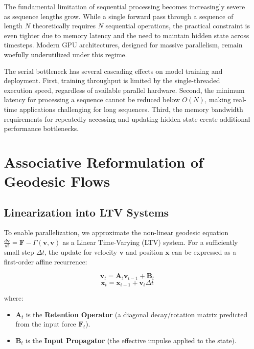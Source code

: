 \documentclass[12pt,a4paper]{article}
\newcommand{\bA}{\mathbf{A}}
\newcommand{\bv}{\mathbf{v}}
\newcommand{\bx}{\mathbf{x}}
\begin{document}
The fundamental limitation of sequential processing becomes increasingly severe as sequence lengths grow. While a single forward pass through a sequence of length $N$ theoretically requires $N$ sequential operations, the practical constraint is even tighter due to memory latency and the need to maintain hidden state across timesteps. Modern GPU architectures, designed for massive parallelism, remain woefully underutilized under this regime.

The serial bottleneck has several cascading effects on model training and deployment. First, training throughput is limited by the single-threaded execution speed, regardless of available parallel hardware. Second, the minimum latency for processing a sequence cannot be reduced below $O(N)$, making real-time applications challenging for long sequences. Third, the memory bandwidth requirements for repeatedly accessing and updating hidden state create additional performance bottlenecks.

\section{Associative Reformulation of Geodesic Flows}

\subsection{Linearization into LTV Systems}

To enable parallelization, we approximate the non-linear geodesic equation $\frac{d\mathbf{v}}{dt} = \mathbf{F} - \Gamma(\mathbf{v}, \mathbf{v})$ as a Linear Time-Varying (LTV) system. For a sufficiently small step $\Delta t$, the update for velocity $\mathbf{v}$ and position $\mathbf{x}$ can be expressed as a first-order affine recurrence:

\begin{equation}
\bv_t = \bA_t \bv_{t-1} + \mathbf{B}_t
\end{equation}
\begin{equation}
\bx_t = \bx_{t-1} + \bv_t \Delta t
\end{equation}

where:
\begin{itemize}[leftmargin=1.5cm]
\item $\bA_t$ is the \textbf{Retention Operator} (a diagonal decay/rotation matrix predicted from the input force $\mathbf{F}_t$).
\item $\mathbf{B}_t$ is the \textbf{Input Propagator} (the effective impulse applied to the state).
\end{itemize}
\end{document}
